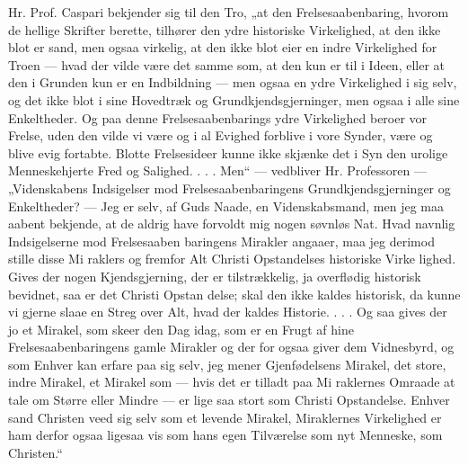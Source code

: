 \documentclass[12pt]{book}
\newcommand{\opage}[1]{\marginnote{\footnotesize\textit{[#1]}}}
\begin{document}
Hr. Prof. Caspari bekjender sig til den Tro, „at den
Frelsesaabenbaring, hvorom de hellige Skrifter berette, tilhører
den ydre historiske Virkelighed, at den ikke blot er sand, men
ogsaa virkelig, at den ikke blot eier en indre Virkelighed for
Troen --- hvad der vilde være det samme som, at den kun
er til i Ideen, eller at den i Grunden kun er en Indbildning
--- men ogsaa en ydre Virkelighed i sig selv, og det ikke
blot i sine Hovedtræk og Grundkjendsgjerninger, men ogsaa
i alle sine Enkeltheder. Og paa denne Frelsesaabenbarings
ydre Virkelighed beroer vor Frelse, uden den vilde vi være
og i al Evighed forblive i vore Synder, være og blive evig
fortabte. Blotte Frelsesideer kunne ikke skjænke det i Syn\-%
den urolige Menneskehjerte Fred og Salighed. . . . Men“ ---
vedbliver Hr. Professoren --- „Videnskabens Indsigelser mod
Frelsesaabenbaringens Grundkjendsgjerninger og Enkeltheder?
--- Jeg er selv, af Guds Naade, en Videnskabsmand, men
jeg maa aabent bekjende, at de aldrig have forvoldt mig nogen
søvnløs Nat. Hvad navnlig Indsigelserne mod Frelsesaaben\-%
baringens Mirakler angaaer, maa jeg derimod stille disse Mi\-%
raklers og fremfor Alt Christi Opstandelses historiske Virke\-%
lighed. Gives der nogen Kjendsgjerning, der er tilstrækkelig,
ja overflødig historisk bevidnet, saa er det Christi Opstan\-%
delse; skal den ikke kaldes historisk, da kunne vi gjerne slaae
en Streg over Alt, hvad der kaldes Historie. . . . Og saa
gives der jo et Mirakel, som skeer den Dag idag, som er en
Frugt af hine Frelsesaabenbaringens gamle Mirakler og der\-%
for ogsaa giver dem Vidnesbyrd, og som Enhver kan erfare
paa sig selv, jeg mener Gjenfødelsens Mirakel, det store,
indre Mirakel, et Mirakel som --- hvis det er tilladt paa Mi\-%
\opage{299}\setcounter{footnote}{0}%
raklernes Omraade at tale om Større eller Mindre --- er lige\-%
saa stort som Christi Opstandelse. Enhver sand Christen
veed sig selv som et levende Mirakel, Miraklernes Virkelighed
er ham derfor ogsaa ligesaa vis som hans egen Tilværelse
som nyt Menneske, som Christen.“
\end{document}
